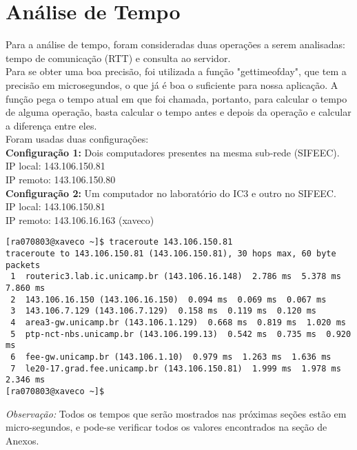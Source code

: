 \documentclass[11pt,twoside]{article}
\begin{document}
\section{Análise de Tempo}
Para a análise de tempo, foram consideradas duas operações a serem analisadas: tempo de comunicação (RTT) e consulta ao servidor.\\
Para se obter uma boa precisão, foi utilizada a função "gettimeofday", que tem a precisão em microsegundos, o que já é boa o suficiente para nossa aplicação. A função pega o tempo atual em que foi chamada, portanto, para calcular o tempo de alguma operação, basta calcular o tempo antes e depois da operação e calcular a diferença entre eles.\\
Foram usadas duas configurações:\\
\textbf{Configuração 1: }Dois computadores presentes na mesma sub-rede (SIFEEC).\\
IP local: 143.106.150.81\\
IP remoto: 143.106.150.80\\
\textbf{Configuração 2: }Um computador no laboratório do IC3 e outro no SIFEEC.\\
IP local: 143.106.150.81\\
IP remoto: 143.106.16.163 (xaveco)\\
\begin{verbatim}
[ra070803@xaveco ~]$ traceroute 143.106.150.81
traceroute to 143.106.150.81 (143.106.150.81), 30 hops max, 60 byte packets
 1  routeric3.lab.ic.unicamp.br (143.106.16.148)  2.786 ms  5.378 ms  7.860 ms
 2  143.106.16.150 (143.106.16.150)  0.094 ms  0.069 ms  0.067 ms
 3  143.106.7.129 (143.106.7.129)  0.158 ms  0.119 ms  0.120 ms
 4  area3-gw.unicamp.br (143.106.1.129)  0.668 ms  0.819 ms  1.020 ms
 5  ptp-nct-nbs.unicamp.br (143.106.199.13)  0.542 ms  0.735 ms  0.920 ms
 6  fee-gw.unicamp.br (143.106.1.10)  0.979 ms  1.263 ms  1.636 ms
 7  le20-17.grad.fee.unicamp.br (143.106.150.81)  1.999 ms  1.978 ms  2.346 ms
[ra070803@xaveco ~]$
\end{verbatim}
\textit{Observação: }Todos os tempos que serão mostrados nas próximas seções estão em micro-segundos, e pode-se verificar todos os valores encontrados na seção de Anexos.\\
\end{document}
